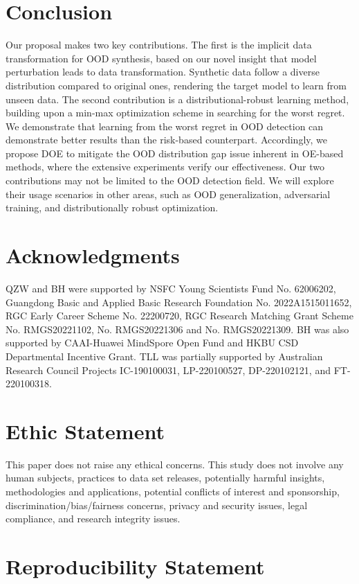 \documentclass{article} \usepackage{iclr2022_conference,times}
\begin{document}
\section{Conclusion}

Our proposal makes two key contributions. The first is the implicit data transformation for OOD synthesis, based on our novel insight that model perturbation leads to data transformation. Synthetic data follow a diverse distribution compared to original ones, rendering the target model to learn from unseen data. The second contribution is a distributional-robust learning method, building upon a min-max optimization scheme in searching for the worst regret. We demonstrate that learning from the worst regret in OOD detection can demonstrate better results than the risk-based counterpart. Accordingly, we propose DOE to mitigate the OOD distribution gap issue inherent in OE-based methods, where the extensive experiments verify our effectiveness. Our two contributions may not be limited to the OOD detection field. We will explore their usage scenarios in other areas, such as OOD generalization, adversarial training, and distributionally robust optimization.

\section{Acknowledgments}
QZW and BH were supported by NSFC Young Scientists Fund No. 62006202, Guangdong Basic and Applied Basic Research Foundation No. 2022A1515011652, RGC Early Career Scheme No. 22200720, RGC Research Matching Grant Scheme No. RMGS20221102, No. RMGS20221306 and No. RMGS20221309. BH was also supported by CAAI-Huawei MindSpore Open Fund and HKBU CSD Departmental Incentive Grant.
TLL was partially supported by Australian Research Council Projects IC-190100031, LP-220100527, DP-220102121, and FT-220100318. 




\section{Ethic Statement}
This paper does not raise any ethical concerns. This study does not involve any human subjects, practices to data set releases, potentially harmful insights, methodologies and applications, potential conflicts of interest and sponsorship, discrimination/bias/fairness concerns, privacy and security issues, legal compliance, and research integrity issues.

\section{Reproducibility Statement}
\end{document}
